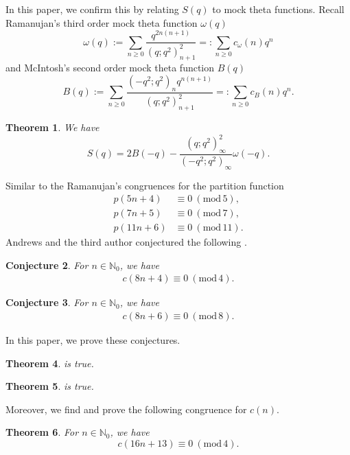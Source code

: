 \documentclass[12pt,reqno]{amsart}
\renewcommand{\o}{{\omega}}
\renewcommand{\(}{\left\(}
\renewcommand{\)}{\right\)}
\numberwithin{equation}{section}
\theoremstyle{plain}
\newtheorem{theorem}{Theorem}[section]
\newtheorem{conjecture}[theorem]{Conjecture}
\theoremstyle{definition}
\numberwithin{equation}{section}
\renewcommand{\pmod}[1]{\ \left( \mathrm{mod} \, #1 \right)}
\begin{document}
In this paper, we confirm this by relating $S(q)$ to mock theta functions. Recall Ramanujan's third order mock theta function $\o(q)$ %
\begin{equation}\label{Ramanujanomega}
\omega(q):=\sum_{n\ge0}\frac{q^{2n(n+1)}}{\left(q;q^2\right)^2_{n+1}}=:\sum_{n\ge 0}c_{\o}(n)q^n
\end{equation}
and  McIntosh's \cite{McIntosh} second order mock theta function $B(q)$ 
\begin{equation}\label{McIntosh}
B(q):=\sum_{n\ge 0}\frac{\left(-q^2;q^2\right)_n q^{n(n+1)}}{\left(q;q^2\right)^2_{n+1}}=:\sum_{n\ge 0}c_B(n)q^n.
\end{equation}
\begin{theorem}\label{lem1}
	We have
	\[
	S(q)=2B(-q)-\frac{\left(q;q^2\right)^2_{\infty}}{\left(-q^2;q^2\right)_{\infty}}\o(-q).
	\]
\end{theorem}
 Similar to the Ramanujan’s congruences for the partition function
\begin{align*}
p(5n+4)&\equiv 0\pmod{5},\\ 
p(7n+5)&\equiv 0\pmod{7},\\ 
p(11n+6)&\equiv 0\pmod{11}.
\end{align*}
 Andrews and the third author conjectured the following \cite[Conjectures 1 and 2]{AB}.
\begin{conjecture}\label{conj1a}
For $n\in \mathbb{N}_0$, we have
\begin{align*}
c(8n+4)\equiv 0\pmod{4}.
\end{align*}
\end{conjecture}
\begin{conjecture}\label{conj1b}
	For $n\in \mathbb{N}_0$, we have
	\begin{align*}
	c(8n+6)\equiv 0\pmod{8}.
	\end{align*}
\end{conjecture}


In this paper, we prove these conjectures.

\begin{theorem}\label{ABConj1}
 is true.
\end{theorem}

\begin{theorem}\label{ABConj1a}
	 is true.
\end{theorem}

 Moreover, we find and prove the following congruence for $c(n)$. 

\begin{theorem}\label{newthm}
For $n\in \mathbb{N}_0$, we have
\[
	c(16n+13)\equiv 0 \pmod 4.
\]
\end{theorem}
\end{document}
